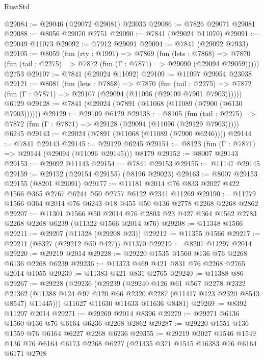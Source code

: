 \begin{lexlean}{RustStd}
\begin{coremodule}
@29084 := @29046 (@29072 @29081) @23033
@29086 := @7826 @29071 @29081
@29088 := @8056 @29070 @2751
@29090 := @7841 (@29024 @11070)
@29091 := @29049 @11073
@29092 := @7912 @29091
@29094 := @7841 (@29092 @7933)
@29105 := @8059
    (fun (rty : @1991) =>
    @7869
      (fun (lets : @7868) =>
      @7870 (fun (tail : @2275) => @7872 (fun (Γ : @7871) => @29090 (@29094 @29059)))))
    @2753
@29107 := @7841 (@29024 @11092)
@29109 := @11097 @29054 @23038
@29121 := @8081
    (fun (lets : @7868) =>
    @7870
      (fun (tail : @2275) =>
      @7872 (fun (Γ : @7871) => @29107 (@29094 (@11096 (@29109 @7901 @7903))))))
    @6129
@29128 := @7841 (@29024 (@7891 (@11068 (@11089 (@7900 (@6130 @7903))))))
@29129 := @29109 @6129
@29138 := @8105
    (fun (tail : @2275) => @7872 (fun (Γ : @7871) => @29128 (@29094 (@11096 (@29129 @7903)))))
    @6245
@29143 := @29024 (@7891 (@11068 (@11089 (@7900 @6246))))
@29144 := @7841 @29143
@29145 := @29129 @6245
@29151 := @8123 (fun (Γ : @7871) => @29144 (@29094 (@11096 @29145))) @8179
@29152 := @8007 @29143
@29153 := @29092 @11143
@29154 := @7841 @29153
@29155 := @11147 @29145
@29159 := @29152 (@29154 @29155) (@8196 @29023)
@29163 := @8007 @29153 @29155 (@8201 @29091)
@29177 := @11181 @2014 @76 @833 @2027 @422 @1566 @365 @2767 @6244 @50 @2757 @6122 @2341 @11269
@29190 := @11279 @1566 @364 @2014 @76 @6243 @18 @455 @50 @136 @2778 @2268 @2268 @2862
@29207 := @11301
    @1566
    @50
    @2014
    @76
    @2803
    @23
    @427
    @364
    @1562
    @2783
    @2268
    @2268
    @6239
    (@11322 @1566 @2014 @76)
@29208 := @11348 @1566
@29211 := @29207 (@11328 (@29208 @23))
@29212 := @11355 @1566
@29217 := @29211 (@8327 (@29212 @50 @427)) @11370
@29219 := @8207 @11297 @2014
@29220 := @29219 @2014
@29228 := @29220 @1535 @1560 @136 @76 @2268 @6136 @2268 @6239
@29236 := @11373 @469 @421 @831 @76 @2268 @2765 @2014 @1055
@29239 := @11383 @421 @831 @2765
@29240 := @11388 @86
@29267 := @29228
    (@29236
      (@29239
        (@29240
          @126
          @61
          @567
          @2278
          @2322
          @21362
          (@11388 @124 @97 @120 @66 @2320 @2287 (@11417 @123 @2320 @8543 @8547) @11445)))
      @11627
      @11630
      @11633
      @11636
      @8481)
@29269 := @8392 @11297 @2014
@29271 := @29269 @2014 @8396
@29279 := @29271 @6136 @1560 @136 @76 @6164 @6236 @2268 @2862
@29287 := @29220 @1551 @136 @1559 @76 @6164 @6227 @2268 @6236
@29355 := @29219
    @2027
    @1546
    @1549
    @136
    @76
    @6164
    @6173
    @2268
    @6227
    (@21335
      @371
      @1545
      @16383
      @76
      @6164
      @6171
      @2708

\end{coremodule}
\end{lexlean}
